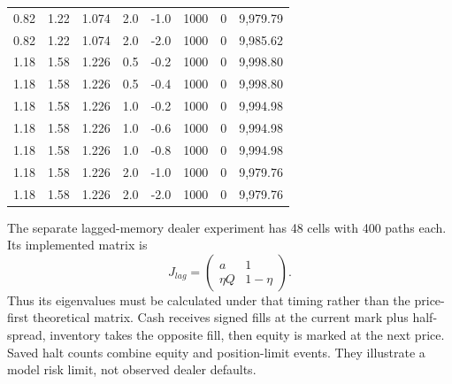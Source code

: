 \documentclass[12pt]{article}
\theoremstyle{definition}
\theoremstyle{remark}
\begin{document}
\begin{table}[htbp]
{\begin{tabular}{lrrrrrrr}
0.82 & 1.22 & 1.074 & 2.0 & -1.0 & 1000 & 0 & 9,979.79 \\
0.82 & 1.22 & 1.074 & 2.0 & -2.0 & 1000 & 0 & 9,985.62 \\
1.18 & 1.58 & 1.226 & 0.5 & -0.2 & 1000 & 0 & 9,998.80 \\
1.18 & 1.58 & 1.226 & 0.5 & -0.4 & 1000 & 0 & 9,998.80 \\
1.18 & 1.58 & 1.226 & 1.0 & -0.2 & 1000 & 0 & 9,994.98 \\
1.18 & 1.58 & 1.226 & 1.0 & -0.6 & 1000 & 0 & 9,994.98 \\
1.18 & 1.58 & 1.226 & 1.0 & -0.8 & 1000 & 0 & 9,994.98 \\
1.18 & 1.58 & 1.226 & 2.0 & -1.0 & 1000 & 0 & 9,979.76 \\
1.18 & 1.58 & 1.226 & 2.0 & -2.0 & 1000 & 0 & 9,979.76 \\
\bottomrule\end{tabular}}
\end{table}

The separate lagged-memory dealer experiment has 48 cells with 400 paths each. Its implemented matrix is \[J_{lag}=\begin{pmatrix}a&1\\\eta Q&1-\eta\end{pmatrix}.\] Thus its eigenvalues must be calculated under that timing rather than the price-first theoretical matrix. Cash receives signed fills at the current mark plus half-spread, inventory takes the opposite fill, then equity is marked at the next price. Saved halt counts combine equity and position-limit events. They illustrate a model risk limit, not observed dealer defaults.
\begin{table}[htbp]
\centering\footnotesize\setlength{\tabcolsep}{3pt}
\caption{Reproduced existing lagged-memory dealer simulations at leverage parameter 10. A halt occurs at nonpositive equity or the model position limit; these causes are not separated in the archived counts. B1/B2/B3 reuse saved model flow moments, not estimated real dealer fills. All 48 cells and exact binomial intervals remain available.}
\label{tab:dealer_drawdown_stats}
\end{table}
\end{document}
